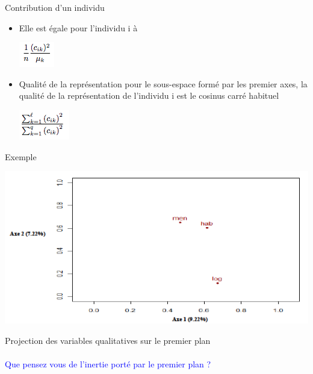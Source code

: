 \documentclass[11pt]{beamer}
\begin{document}

\begin{frame}{ Contribution d’un individu }
 
 \begin{itemize}
 
 \centering  
 \item   Elle est égale pour l'individu i à 
 
 \includegraphics[scale=.8]{AFC12} 


\item Qualité de la représentation pour le sous-espace formé
par les  premier axes, la qualité de la représentation de
l'individu i est le cosinus carré habituel
   
    \includegraphics[scale=.8]{AFC13} 
 \end{itemize}
 
 
\end{frame}


\begin{frame}{Exemple}

 \includegraphics[scale=.5]{ACM1} 


\centering Projection des variables qualitatives sur le premier plan\\~\\

\textcolor{blue}{Que pensez vous de l'inertie porté par le premier plan ?}

\end{frame}
\end{document}

